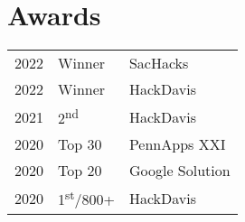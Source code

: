 \documentclass[]{deedy-resume-openfont}
\begin{document}
\begin{minipage}[t]{0.33\textwidth}

\section{Awards} 
\begin{tabular}{rll}
2022 & Winner & SacHacks\\
2022 & Winner & HackDavis\\
2021 & 2\textsuperscript{nd} & HackDavis\\
2020 & Top 30 & PennApps XXI\\
2020 & Top 20  & Google Solution\\
2020 & 1\textsuperscript{st}/800+  & HackDavis\\
\end{tabular}
\sectionsep

%
%

\end{minipage} 
\hfill
\end{document}
